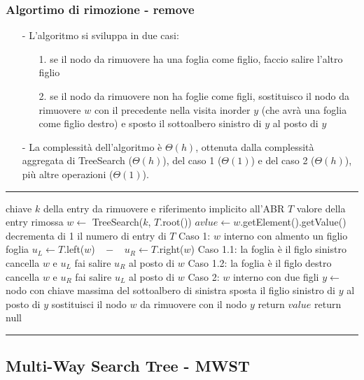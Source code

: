 \documentclass[a4paper]{article}
\makeatletter
\newenvironment{algo}[4]{
	\noindent\rule{\textwidth}{0.4pt}
	\begin{algorithmic}[1]
		\addtocounter{ALG@line}{-1}
		\Procedure{#1}{#2}
		\Require #3
		\Ensure #4
		\Statex }{
		\EndProcedure
	\end{algorithmic}
	\rule{\textwidth}{0.4pt}}
\makeatother
\begin{document}
\subsubsection*{Algortimo di rimozione - remove}
\begin{itemize}[topsep=3pt, itemsep=0pt]
	\item[-] L'algoritmo si sviluppa in due casi:
	\begin{itemize}[topsep=0pt, itemsep=0pt]
		\item[1.] se il nodo da rimuovere ha una foglia come figlio, faccio salire l'altro figlio
		\item[2.] se il nodo da rimuovere non ha foglie come figli, sostituisco il nodo da rimuovere \(w\) con il precedente nella
		visita inorder \(y\) (che avrà una foglia come figlio destro) e sposto il sottoalbero sinistro di \(y\) al posto di \(y\)
	\end{itemize}
	\item[-] La complessità dell'algoritmo è \(\Theta(h)\), ottenuta dalla complessità aggregata di TreeSearch (\(\Theta(h)\)),
	del caso 1 (\(\Theta(1)\)) e del caso 2 (\(\Theta(h)\)), più altre operazioni (\(\Theta(1)\)).
\end{itemize}
\begin{algo}{remove}{$k$}{chiave $k$ della entry da rimuovere e riferimento implicito all'ABR $T$}{valore della entry rimossa}
	\State $w \gets$ TreeSearch($k$, $T$.root())
		\State $avlue \gets w$.getElement().getValue()
		\State decrementa di 1 il numero di entry di $T$
		\State \Comment Caso 1: $w$ interno con almento un figlio foglia
			\State $u_L \gets T$.left($w$) $\;\; - \;\;$ $u_R \gets T$.right($w$)
			 \Comment Caso 1.1: la foglia è il figlo sinistro
				\State cancella $w$ e $u_L$
				\State fai salire $u_R$ al posto di $w$
			\Else \Comment Caso 1.2: la foglia è il figlo destro
				\State cancella $w$ e $u_R$
				\State fai salire $u_L$ al posto di $w$
			\EndIf
		\Else \Comment Caso 2: $w$ interno con due figli
			\State $y \gets$ nodo con chiave massima del sottoalbero di sinistra
			\State sposta il figlio sinistro di $y$ al posto di $y$
			\State sostituisci il nodo $w$ da rimuovere con il nodo $y$
		\EndIf
		\State return $value$
	\Else
		\State return null
	\EndIf
\end{algo}

\newpage

\subsection{Multi-Way Search Tree - MWST}
\end{document}
